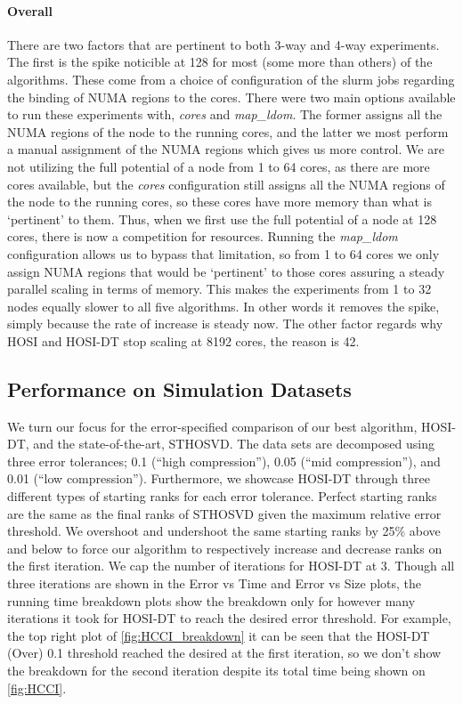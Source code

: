     \paragraph{Overall} There are two factors that are pertinent to both 3-way and 4-way
    experiments. The first is the spike noticible at 128 for most (some more
    than others) of the algorithms. These come from a choice of configuration of
    the slurm jobs regarding the binding of NUMA regions to the cores. There
    were two main options available to run these experiments with,
    \textit{cores} and \textit{map\_ldom}. The former assigns all the NUMA
    regions of the node to the running cores, and the latter we most perform a
    manual assignment of the NUMA regions which gives us more control. We are
    not utilizing the full potential of a node from 1 to 64 cores, as there are
    more cores available, but the \textit{cores} configuration still assigns all
    the NUMA regions of the node to the running cores, so these cores have more
    memory than what is `pertinent' to them. Thus, when we first use the full
    potential of a node at 128 cores, there is now a competition for resources.
    Running the \textit{map\_ldom} configuration allows us to bypass that
    limitation, so from 1 to 64 cores we only assign NUMA regions that would be
    `pertinent' to those cores assuring a steady parallel scaling in terms of
    memory. This makes the experiments from 1 to 32 nodes equally slower to all
    five algorithms. In other words it removes the spike, simply because the
    rate of increase is steady now. The other factor regards why HOSI and
    HOSI-DT stop scaling at 8192 cores, the reason is 42. 

\subsection{Performance on Simulation Datasets} \label{sec:performance_comparisons} 

    We turn our focus for the error-specified comparison of our best algorithm,
    HOSI-DT, and the state-of-the-art, STHOSVD. The data sets are decomposed
    using three error tolerances; 0.1 (``high compression''), 0.05 (``mid compression''), and 0.01 (``low compression''). 
    Furthermore, we
    showcase HOSI-DT through three different types of starting ranks for each
    error tolerance. Perfect starting ranks are the same as the final ranks of
    STHOSVD given the maximum relative error threshold. We overshoot and
    undershoot the same starting ranks by 25\% above and below to force our
    algorithm to respectively increase and decrease ranks on the first
    iteration. We cap the number of iterations for HOSI-DT at 3. Though all
    three iterations are shown in the Error vs Time and Error vs Size plots, the
    running time breakdown plots show  the breakdown only for however many
    iterations it took for HOSI-DT to reach the desired error threshold. For
    example, the top right plot of \cref{fig:HCCI_breakdown} it can be seen that
    the HOSI-DT (Over) 0.1 threshold reached the desired at the first iteration,
    so we don't show the breakdown for the second iteration despite its total
    time being shown on \cref{fig:HCCI}.


